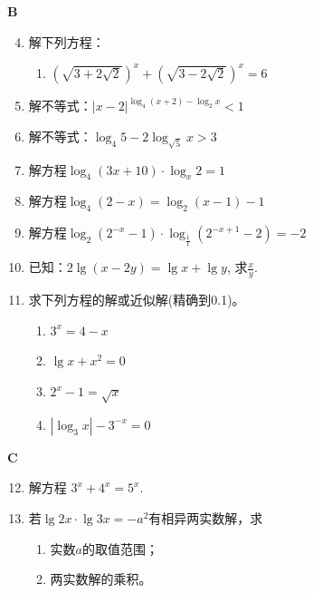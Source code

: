 \begin{center}
    \bfseries B
\end{center}
\begin{enumerate}\setcounter{enumi}{3}
    \item 解下列方程：
\begin{enumerate}[(1)]
    \item $\left(\sqrt{3+2\sqrt{2}}\right)^x+\left(\sqrt{3-2\sqrt{2}}\right)^x=6$
\end{enumerate}

\item 解不等式：$|x-2|^{\log_{4}(x+2)-\log_{2}x}<1$
\item 解不等式：$\log_{4}5-2\log_{\sqrt{5}}x>3$

\item 解方程$\log_{4}(3x+10)\cdot\log_x 2=1$
\item 解方程$\log_{4}(2-x)=\log_{2}(x-1)-1$
\item 解方程$\log_{2}(2^{-x}-1)\cdot\log_{\tfrac{1}{1}}(2^{-x+1}-2)=-2$

\item 已知：$2\lg ( x- 2y) = \lg x+ \lg y$, 求$\frac xy$.

\item 求下列方程的解或近似解(精确到0.1)。
\begin{multicols}{2}
\begin{enumerate}[(1)]
    \item $3^{x}=4-x$
    \item $\lg x+x^{2}=0$
    \item $2^{x }- 1= \sqrt {x}$
    \item $|\log_3 x|- 3^{-x}= 0$
\end{enumerate}
\end{multicols}

\end{enumerate}

\begin{center}
    \bfseries C
\end{center}
\begin{enumerate}\setcounter{enumi}{11}
    \item 解方程 $3^x+4^x=5^x$.
\item 若$\lg 2x\cdot\lg3x=-a^2$有相异两实数解，求
\begin{enumerate}[(1)]
    \item 实数$a$的取值范围；
    \item 两实数解的乘积。
\end{enumerate}
\end{enumerate}

